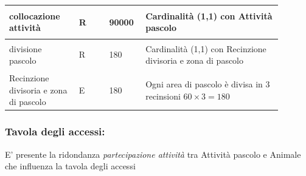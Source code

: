 \documentclass[12pt,a4paper]{article}
\begin{document}
\begin{center}
\begin{longtable}{|p{0.23\linewidth}|p{0.1\linewidth}|p{0.11\linewidth}|p{0.45\linewidth}|}
\hline
collocazione attività 				& \begin{center}
\vspace{-25pt}R
\end{center}
					& \begin{center}
					\vspace{-25pt}90000\end{center}
					&  Cardinalità (1,1) con Attività pascolo \\ 

\hline
divisione pascolo 				& \begin{center}
\vspace{-25pt}R
\end{center}
					& \begin{center}
					\vspace{-25pt}180\end{center}
					&  Cardinalità (1,1) con Recinzione divisoria e zona di pascolo \\ 

\hline
Recinzione divisoria e zona di pascolo 				& \begin{center}
\vspace{-25pt}E
\end{center}
					& \begin{center}
					\vspace{-25pt}180\end{center}
					&  Ogni area di pascolo è divisa in 3 recinsioni $60\times 3= 180$\\ 

\hline

\end{longtable}\end{center}
\subsubsection*{Tavola degli accessi:}

E' presente la ridondanza \textit{partecipazione attività} tra Attività pascolo e Animale che influenza la tavola degli accessi
\end{document}
